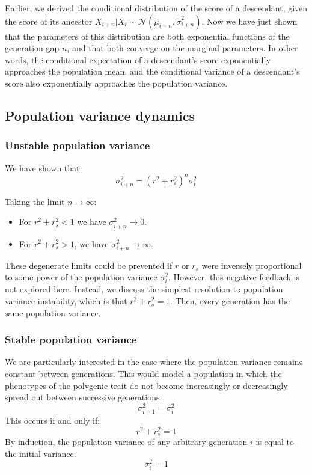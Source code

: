 \documentclass[letterpaper,10pt]{article} %
\begin{document}
Earlier, we derived the conditional distribution of the score of a descendant, given the score of its ancestor $X_{i+n}|X_i \sim \mathcal{N}( \tilde{\mu}_{i+n}, \tilde{\sigma}_{i+n}^2)$. Now we have just shown that the parameters of this distribution are both exponential functions of the generation gap $n$, and that both converge on the marginal parameters. In other words, the conditional expectation of a descendant's score exponentially approaches the population mean, and the conditional variance of a descendant's score also exponentially approaches the population variance. 




\subsection{Population variance dynamics}

\subsubsection*{Unstable population variance}
We have shown that:
$$\sigma_{i+n}^2 = (r^2+r_s^2)^n  \sigma_{i}^2$$

Taking the limit $n \rightarrow \infty$: 
\begin{itemize}
\item For $r^2+r_s^2 < 1$ we have $\sigma_{i+n}^2 \rightarrow 0$.
\item For  $r^2+r_s^2 > 1$, we have $\sigma_{i+n}^2 \rightarrow \infty$. 
\end{itemize}

These degenerate limits could be prevented if $r$ or $r_s$ were inversely proportional to some power of the population variance $\sigma_i^2$. However, this negative feedback is not explored here. Instead, we discuss the simplest resolution to population variance instability, which is that $r^2+r_s^2 = 1$. Then, every generation has the same population variance.

\subsubsection*{Stable population variance}
We are particularly interested in the case where the population variance remains constant between generations. This would model a population in which the phenotypes of the polygenic trait do not become increasingly or decreasingly spread out between successive generations. 
$$\sigma_{i+1}^2 = \sigma_i^2$$
This occurs if and only if:
$$r^2+r_s^2 = 1$$
%
By induction, the population variance of any arbitrary generation $i$ is equal to the initial variance. 
$$\sigma_i^2 = 1$$
\end{document}
